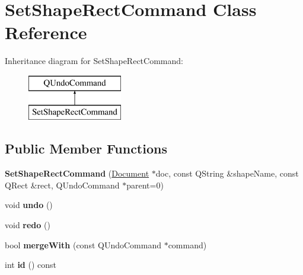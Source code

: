 \hypertarget{class_set_shape_rect_command}{\section{Set\-Shape\-Rect\-Command Class Reference}
\label{class_set_shape_rect_command}
}
Inheritance diagram for Set\-Shape\-Rect\-Command\-:\begin{figure}[H]
\begin{center}
\leavevmode
\includegraphics[height=2.000000cm]{class_set_shape_rect_command}
\end{center}
\end{figure}
\subsection*{Public Member Functions}
\begin{DoxyCompactItemize}
\item 
\hypertarget{class_set_shape_rect_command_acd26d01e46298ec9868e4811064e21a0}{{\bfseries Set\-Shape\-Rect\-Command} (\hyperlink{class_document}{Document} $\ast$doc, const Q\-String \&shape\-Name, const Q\-Rect \&rect, Q\-Undo\-Command $\ast$parent=0)}\label{class_set_shape_rect_command_acd26d01e46298ec9868e4811064e21a0}

\item 
\hypertarget{class_set_shape_rect_command_a736f44211194b41eef8b65103ab05fc7}{void {\bfseries undo} ()}\label{class_set_shape_rect_command_a736f44211194b41eef8b65103ab05fc7}

\item 
\hypertarget{class_set_shape_rect_command_adca279fb4f98d51b425976a22bf8cbf4}{void {\bfseries redo} ()}\label{class_set_shape_rect_command_adca279fb4f98d51b425976a22bf8cbf4}

\item 
\hypertarget{class_set_shape_rect_command_a60e439b8a3dc3be8d739a3e7ab94337f}{bool {\bfseries merge\-With} (const Q\-Undo\-Command $\ast$command)}\label{class_set_shape_rect_command_a60e439b8a3dc3be8d739a3e7ab94337f}

\item 
\hypertarget{class_set_shape_rect_command_a243eb1e249e5d949c72001faf9571fe5}{int {\bfseries id} () const }\label{class_set_shape_rect_command_a243eb1e249e5d949c72001faf9571fe5}

\end{DoxyCompactItemize}


